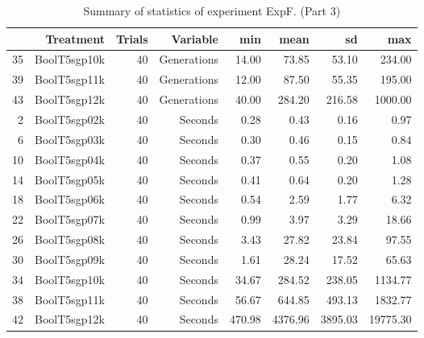 \begin{table}[ht]
\centering
\begin{tabular}{rrrrrrrr}
  \hline
 & Treatment & Trials & Variable & min & mean & sd & max \\ 
  \hline
35 & BoolT5sgp10k &  40 & Generations & 14.00 & 73.85 & 53.10 & 234.00 \\ 
  39 & BoolT5sgp11k &  40 & Generations & 12.00 & 87.50 & 55.35 & 195.00 \\ 
  43 & BoolT5sgp12k &  40 & Generations & 40.00 & 284.20 & 216.58 & 1000.00 \\ 
  2 & BoolT5sgp02k &  40 & Seconds & 0.28 & 0.43 & 0.16 & 0.97 \\ 
  6 & BoolT5sgp03k &  40 & Seconds & 0.30 & 0.46 & 0.15 & 0.84 \\ 
  10 & BoolT5sgp04k &  40 & Seconds & 0.37 & 0.55 & 0.20 & 1.08 \\ 
  14 & BoolT5sgp05k &  40 & Seconds & 0.41 & 0.64 & 0.20 & 1.28 \\ 
  18 & BoolT5sgp06k &  40 & Seconds & 0.54 & 2.59 & 1.77 & 6.32 \\ 
  22 & BoolT5sgp07k &  40 & Seconds & 0.99 & 3.97 & 3.29 & 18.66 \\ 
  26 & BoolT5sgp08k &  40 & Seconds & 3.43 & 27.82 & 23.84 & 97.55 \\ 
  30 & BoolT5sgp09k &  40 & Seconds & 1.61 & 28.24 & 17.52 & 65.63 \\ 
  34 & BoolT5sgp10k &  40 & Seconds & 34.67 & 284.52 & 238.05 & 1134.77 \\ 
  38 & BoolT5sgp11k &  40 & Seconds & 56.67 & 644.85 & 493.13 & 1832.77 \\ 
  42 & BoolT5sgp12k &  40 & Seconds & 470.98 & 4376.96 & 3895.03 & 19775.30 \\ 
   \hline
\end{tabular}
\caption{Summary of statistics of experiment ExpF. (Part 3)} 
\end{table}

